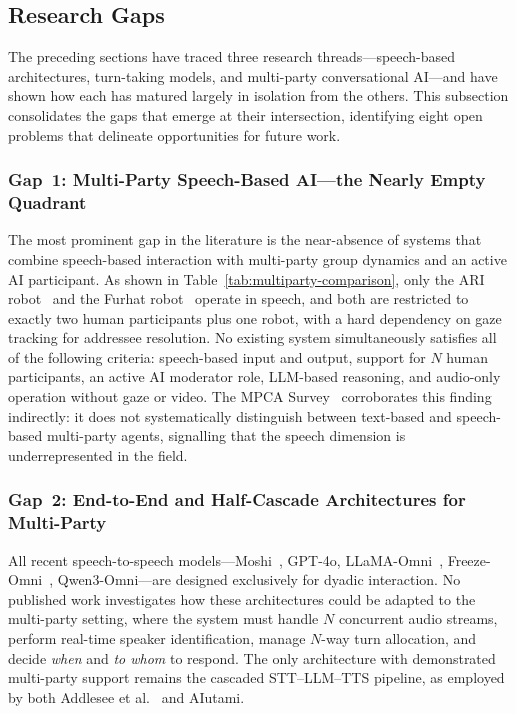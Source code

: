 \subsection{Research Gaps}
\label{subsec:gaps}

The preceding sections have traced three research threads---speech-based
architectures, turn-taking models, and multi-party conversational
AI---and have shown how each has matured largely in isolation from the others.
This subsection consolidates the gaps that emerge at their intersection,
identifying eight open problems that delineate opportunities for future work.

\subsubsection{Gap~1: Multi-Party Speech-Based AI---the Nearly Empty Quadrant}
\label{sssec:gap1}

The most prominent gap in the literature is the near-absence of systems that
combine speech-based interaction with multi-party group dynamics and an active
AI participant.  As shown in Table~\ref{tab:multiparty-comparison}, only the
ARI robot~\cite{addlesee2024ari} and the Furhat
robot~\cite{axelsson2025furhat} operate in speech, and both are restricted to
exactly two human participants plus one robot, with a hard dependency on gaze
tracking for addressee resolution.  No existing system simultaneously satisfies
all of the following criteria: speech-based input and output, support for $N$
human participants, an active AI moderator role, LLM-based reasoning, and
audio-only operation without gaze or video.  The MPCA
Survey~\cite{mpcasurvey2025} corroborates this finding indirectly: it does not
systematically distinguish between text-based and speech-based multi-party
agents, signalling that the speech dimension is underrepresented in the field.

\subsubsection{Gap~2: End-to-End and Half-Cascade Architectures for Multi-Party}
\label{sssec:gap2}

All recent speech-to-speech models---Moshi~\cite{defossez2024moshi},
GPT-4o, LLaMA-Omni~\cite{fang2024llamaomni},
Freeze-Omni~\cite{wang2024freezeomni}, Qwen3-Omni---are
designed exclusively for dyadic interaction.  No published work investigates
how these architectures could be adapted to the multi-party setting, where the
system must handle $N$ concurrent audio streams, perform real-time speaker
identification, manage $N$-way turn allocation, and decide \emph{when} and
\emph{to whom} to respond.  The only architecture with demonstrated multi-party
support remains the cascaded STT--LLM--TTS pipeline, as employed by both
Addlesee et al.~\cite{addlesee2024ari} and AIutami.

